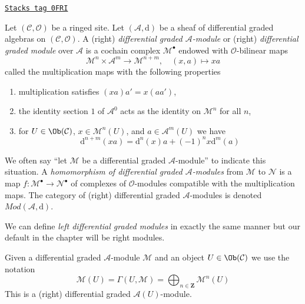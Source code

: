 \begin{definition}[Dgm]
\label{sdga-definition-dgm}
\href{https://stacks.math.columbia.edu/tag/0FRI}{\texttt{Stacks tag 0FRI}}

Let $(\mathcal{C}, \mathcal{O})$ be a ringed site.
Let $(\mathcal{A}, \text{d})$ be a sheaf of differential graded algebras
on $(\mathcal{C}, \mathcal{O})$.
A (right) {\it differential graded $\mathcal{A}$-module} or (right)
{\it differential graded module} over $\mathcal{A}$
is a cochain complex $\mathcal{M}^\bullet$ endowed with
$\mathcal{O}$-bilinear maps
$$
\mathcal{M}^n \times \mathcal{A}^m \to \mathcal{M}^{n + m},\quad
(x, a) \longmapsto xa
$$
called the multiplication maps with the following properties
\begin{enumerate}
\item multiplication satisfies $(xa)a' = x(aa')$,
\item the identity section $1$ of $\mathcal{A}^0$
acts as the identity on $\mathcal{M}^n$ for all $n$,
\item for $U \in \Ob(\mathcal{C})$, $x \in \mathcal{M}^n(U)$, and
$a \in \mathcal{A}^m(U)$ we have
$$
\text{d}^{n + m}(xa) = \text{d}^n(x)a + (-1)^n x\text{d}^m(a)
$$
\end{enumerate}
We often say ``let $\mathcal{M}$ be a differential graded
$\mathcal{A}$-module'' to indicate this situation.
A {\it homomorphism of differential graded $\mathcal{A}$-modules}
from $\mathcal{M}$ to $\mathcal{N}$ is a map
$f : \mathcal{M}^\bullet \to \mathcal{N}^\bullet$ of complexes
of $\mathcal{O}$-modules compatible with the multiplication maps.
The category of (right) differential graded $\mathcal{A}$-modules
is denoted $\textit{Mod}(\mathcal{A}, \text{d})$.
\end{definition}

We can define {\it left differential graded modules} in exactly the same manner
but our default in the chapter will be right modules.

\medskip\noindent
Given a differential graded $\mathcal{A}$-module $\mathcal{M}$
and an object $U \in \Ob(\mathcal{C})$ we use the notation
$$
\mathcal{M}(U) =
\Gamma(U, \mathcal{M}) =
\bigoplus\nolimits_{n \in \mathbf{Z}} \mathcal{M}^n(U)
$$
This is a (right) differential graded $\mathcal{A}(U)$-module.

